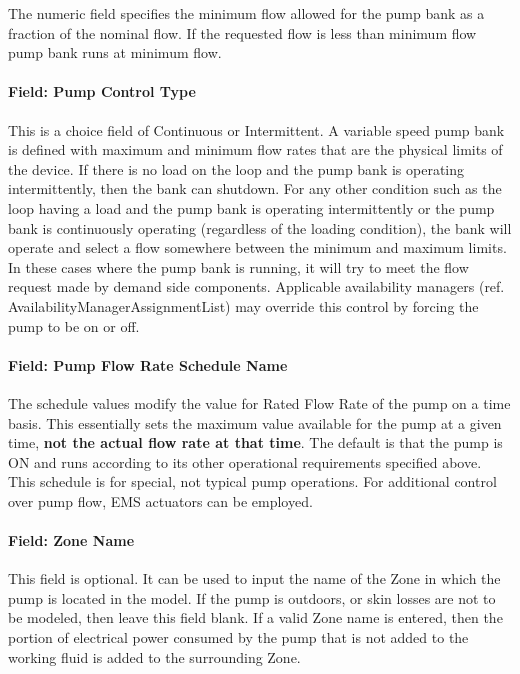 The numeric field specifies the minimum flow allowed for the pump bank as a fraction of the nominal flow. If the requested flow is less than minimum flow pump bank runs at minimum flow.

\paragraph{Field: Pump Control Type}\label{field-pump-control-type-3}

This is a choice field of Continuous or Intermittent. A variable speed pump bank is defined with maximum and minimum flow rates that are the physical limits of the device. If there is no load on the loop and the pump bank is operating intermittently, then the bank can shutdown. For any other condition such as the loop having a load and the pump bank is operating intermittently or the pump bank is continuously operating (regardless of the loading condition), the bank will operate and select a flow somewhere between the minimum and maximum limits. In these cases where the pump bank is running, it will try to meet the flow request made by demand side components. Applicable availability managers (ref. AvailabilityManagerAssignmentList) may override this control by forcing the pump to be on or off.

\paragraph{Field: Pump Flow Rate Schedule Name}\label{field-pump-flow-rate-schedule-name-4}

The schedule values modify the value for Rated Flow Rate of the pump on a time basis. This essentially sets the maximum value available for the pump at a given time, \textbf{not the actual flow rate at that time}. The default is that the pump is ON and runs according to its other operational requirements specified above. This schedule is for special, not typical pump operations. For additional control over pump flow, EMS actuators can be employed.

\paragraph{Field: Zone Name}\label{field-zone-name-4-003}

This field is optional. It can be used to input the name of the Zone in which the pump is located in the model. If the pump is outdoors, or skin losses are not to be modeled, then leave this field blank. If a valid Zone name is entered, then the portion of electrical power consumed by the pump that is not added to the working fluid is added to the surrounding Zone.

